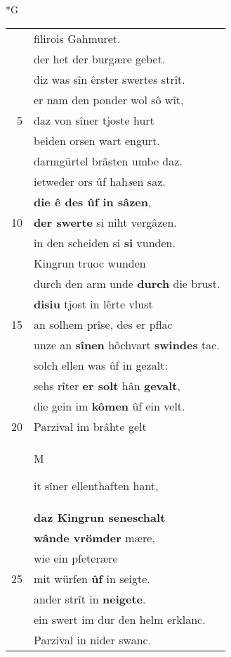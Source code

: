 \documentclass[8pt,a4paper,notitlepage]{article}
\begin{document}
\newpage
\begin{table}[ht]
\begin{minipage}[t]{0.5\linewidth}
\small
\begin{center}*G
\end{center}
\begin{tabular}{rl}
 & filirois Gahmuret.\\ 
 & der het der burgære gebet.\\ 
 & diz was sîn êrster swertes strît.\\ 
 & er nam den ponder wol sô wît,\\ 
5 & daz von sîner tjoste hurt\\ 
 & beiden orsen wart engurt.\\ 
 & darmgürtel brâsten umbe daz.\\ 
 & ietweder ors ûf hah\textit{s}en saz.\\ 
 & \textbf{die ê des ûf in sâzen},\\ 
10 & \textbf{der swerte} si niht vergâzen.\\ 
 & in den scheiden si \textbf{si} vunden.\\ 
 & Kingrun truoc wunden\\ 
 & durch den arm unde \textbf{durch} die brust.\\ 
 & \textbf{disiu} tjost in lêrte vlust\\ 
15 & an solhem prîse, des er pflac\\ 
 & unze an \textbf{sînen} hôchvart \textbf{swindes} tac.\\ 
 & solch ellen was ûf in gezalt:\\ 
 & sehs rîter \textbf{er solt} hân \textbf{gevalt},\\ 
 & die gein im \textbf{kômen} ûf ein velt.\\ 
20 & Parzival im brâhte gelt\\ 
 & \begin{large}M\end{large}it sîner ellenthaften hant,\\ 
 & \textbf{daz Kingrun seneschalt}\\ 
 & \textbf{wânde vrömder} mære,\\ 
 & wie ein pfeterære\\ 
25 & mit würfen \textbf{ûf} in seigte.\\ 
 & ander strît in \textbf{neigete}.\\ 
 & ein swert im dur den helm erklanc.\\ 
 & Parzival in nider swanc.\\ 

\end{tabular}
\end{minipage}
\end{table}
\end{document}

